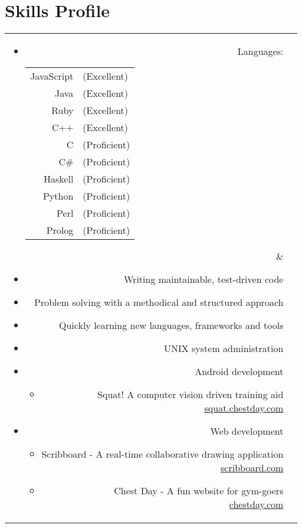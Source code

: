 \section*{Skills Profile}

\begin{tabular}{rl}

\parbox[t]{0.3\textwidth}{
	\begin{itemize}
		\item Languages:
		\begin{tabular}[h]{rl}
			JavaScript & (Excellent)\\
			Java & (Excellent)\\
			Ruby & (Excellent)\\
			C++ & (Excellent)\\
			C & (Proficient)\\
			C\# & (Proficient)\\
			Haskell & (Proficient)\\
			Python & (Proficient)\\
			Perl & (Proficient)\\
			Prolog & (Proficient)
		\end{tabular}
	\end{itemize}}
&
\parbox[t]{0.6\textwidth}{
	\begin{itemize}
		\item Writing maintainable, test-driven code
		\item Problem solving with a methodical and structured approach
		\item Quickly learning new languages, frameworks and tools
		\item UNIX system administration
		\item Android development
			\begin{itemize}
				\item Squat! A computer vision driven training aid\\
				\url{squat.chestday.com}
			\end{itemize}
		\item Web development
			\begin{itemize}
				\item Scribboard - A real-time collaborative drawing application\\
				\url{scribboard.com}
				\item Chest Day - A fun website for gym-goers\\
				\url{chestday.com}
			\end{itemize}
	\end{itemize}}\\

\end{tabular}
